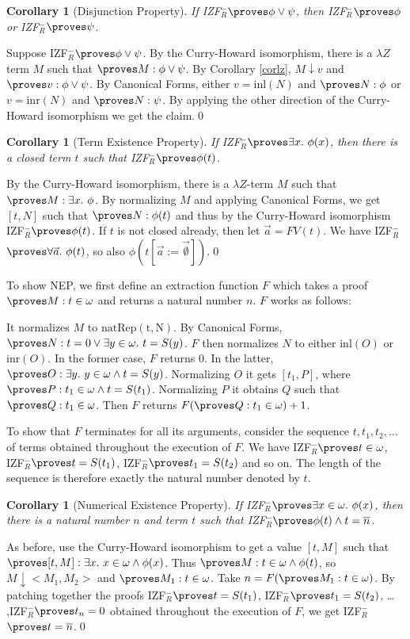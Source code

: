 \documentclass{LMCS}
\newtheorem{corollary}[thm]{Corollary}
\newcommand{\ov}[1]{\ensuremath{\overline{#1}}}
\newcommand{\p}{\proves}
\newcommand{\pl}[1]{\ensuremath{\mathrm{#1}}}
\newcommand{\INL}{\pl{inl}}
\newcommand{\INR}{\pl{inr}}
\newcommand{\iizfr}{IZF${}_R^{-}$}
\newcommand{\li}{\lambda Z}
\begin{document}
\begin{corollary}[Disjunction Property]
If \iizfr $\p \phi \lor \psi$, then \iizfr $\p \phi$ or \iizfr $\p \psi$. 
\end{corollary}
\proof Suppose \iizfr $\p \phi \lor \psi$. By the Curry-Howard isomorphism, there is a
$\li$ term $M$ such that $\p M : \phi \lor \psi$. By Corollary
\ref{corlz}, $M \downarrow v$ and $\p v : \phi \lor \psi$. By
Canonical Forms, either $v = \INL(N)$ and $\p N : \phi$ or $v = \INR(N)$
and $\p N : \psi$. By applying the other direction of the Curry-Howard isomorphism
we get the claim.\qed


\begin{corollary}[Term Existence Property]
If \iizfr $\p \exists x.\ \phi(x)$, then there is a closed term $t$ such that \iizfr $\p
\phi(t)$. 
\end{corollary}
\proof By the Curry-Howard isomorphism, there is a $\li$-term $M$ such that $\p M :
\exists x.\ \phi$. By normalizing $M$ and applying
Canonical Forms, we get $[t, N]$ such that $\p N : \phi(t)$ and thus by
the Curry-Howard isomorphism \iizfr $\p \phi(t)$. If $t$ is not closed already, 
then let $\vec{a} = FV(t)$. We have \iizfr $\p \forall \vec{a}.\ \phi(t)$,
so also $\phi(t[\vec{a}:=\vec{\emptyset}])$.\qed


To show NEP, we first define an extraction function $F$ 
which takes a proof $\p M : t \in \omega$ and returns a natural number $n$.
$F$ works as follows:

It normalizes $M$ to $\pl{natRep(t, N)}$. By Canonical Forms, $\p N
: t = 0 \lor \exists y \in \omega.\ t = S(y)$. $F$ then normalizes $N$ to
either $\INL(O)$ or $\INR(O)$. In the former case, $F$ returns $0$. In the
latter, $\p O : \exists y.\ y \in \omega \land t = S(y)$. Normalizing $O$ it
gets $[t_1, P]$, where $\p P : t_1 \in \omega \land t = S(t_1)$. Normalizing
$P$ it obtains $Q$ such that $\p Q : t_1 \in \omega$. Then $F$ returns $F(\p Q :
t_1 \in \omega) + 1$. 

To show that $F$ terminates for all its arguments, consider the
sequence $t, t_1, t_2, {\ldots} $ of
terms  obtained throughout the execution of $F$.
We have \iizfr $\p t \in \omega$, \iizfr $\p t = S(t_1)$, \iizfr $\p t_1 = S(t_2)$
and so on. The length of the sequence is therefore exactly the natural
number denoted by $t$. 

\begin{corollary}[Numerical Existence Property]
If \iizfr $\p \exists x \in \omega.\ \phi(x)$, then there is a natural number
$n$ and term $t$ such that \iizfr $\p \phi(t) \land t = \ov{n}$. 
\end{corollary}
\proof As before, use the Curry-Howard isomorphism to get a value $[t, M]$ such that $\p 
[t, M] : \exists x.\ x \in \omega \land \phi(x)$. Thus $\p M : t \in \omega
\land \phi(t)$, so $M \downarrow <M_1, M_2>$ and $\p M_1 : t \in \omega$.
Take $n = F(\p M_1 : t \in \omega)$. By patching together
the proofs \iizfr $\p t = S(t_1)$, \iizfr $\p t_1 = S(t_2)$, {\ldots}
,\iizfr $\p t_n = 0$ obtained throughout the execution of $F$, we get \iizfr $\p t = \ov{n}$.\qed
\end{document}
